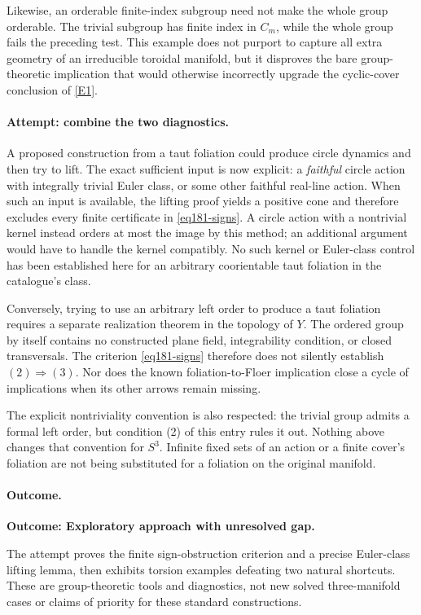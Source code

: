 \documentclass[11pt,a4paper]{article}
\newcommand{\eref}[2]{\hyperlink{extra:#1:#2}{[E#2]}}
\numberwithin{equation}{section}
\begin{document}
Likewise, an orderable finite-index subgroup need not make the whole group
orderable. The trivial subgroup has finite index in $C_m$, while the whole
group fails the preceding test. This example does not purport to capture
all extra geometry of an irreducible toroidal manifold, but it disproves
the bare group-theoretic implication that would otherwise incorrectly
upgrade the cyclic-cover conclusion of \eref{181}{1}.

\paragraph{Attempt: combine the two diagnostics.}
A proposed construction from a taut foliation could produce circle dynamics
and then try to lift. The exact sufficient input is now explicit: a
\emph{faithful} circle action with integrally trivial Euler class, or some
other faithful real-line action. When such an input is available, the
lifting proof yields a positive cone and therefore excludes every finite
certificate in \eqref{eq181-signs}. A circle action with a nontrivial kernel
instead orders at most the image by this method; an additional argument
would have to handle the kernel compatibly. No such kernel or Euler-class
control has been established here for an arbitrary coorientable taut
foliation in the catalogue's class.

Conversely, trying to use an arbitrary left order to produce a taut
foliation requires a separate realization theorem in the topology of $Y$.
The ordered group by itself contains no constructed plane field,
integrability condition, or closed transversals. The criterion
\eqref{eq181-signs} therefore does not silently establish
$(2)\Rightarrow(3)$. Nor does the known foliation-to-Floer implication
close a cycle of implications when its other arrows remain missing.

The explicit nontriviality convention is also respected: the trivial group
admits a formal left order, but condition (2) of this entry rules it out.
Nothing above changes that convention for $S^3$. Infinite fixed sets of
an action or a finite cover's foliation are not being substituted for a
foliation on the original manifold.

\paragraph{Outcome.}
\textbf{Outcome: Exploratory approach with unresolved gap.}

The attempt proves the finite sign-obstruction criterion and a precise
Euler-class lifting lemma, then exhibits torsion examples defeating two
natural shortcuts. These are group-theoretic tools and diagnostics, not
new solved three-manifold cases or claims of priority for these standard
constructions.
\end{document}

